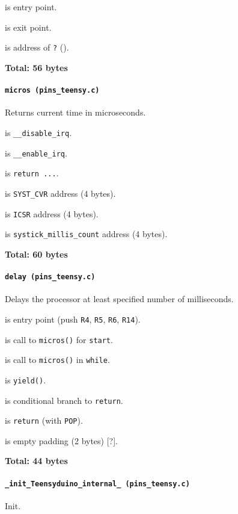  is entry point.

 is exit point.

 is address of \texttt{?} ().

\textbf{Total: 56 bytes}

\paragraph{\texttt{micros (pins\_teensy.c)}} Returns current time in
microseconds.

 is \texttt{\_\_disable\_irq}.

 is \texttt{\_\_enable\_irq}.

 is \texttt{return ...}.

\vspace{1em}

 is \texttt{SYST\_CVR} address (4 bytes).

 is \texttt{ICSR} address (4 bytes).

 is \texttt{systick\_millis\_count} address (4 bytes).

\textbf{Total: 60 bytes}

\paragraph{\texttt{delay (pins\_teensy.c)}} Delays the processor at least
specified number of milliseconds.

 is entry point (push \texttt{R4}, \texttt{R5},
\texttt{R6}, \texttt{R14}).

 is call to \texttt{micros()} for \texttt{start}.

 is call to \texttt{micros()} in \texttt{while}.

 is \texttt{yield()}.

 is conditional branch to \texttt{return}.

 is \texttt{return} (with \texttt{POP}).

 is empty padding (2 bytes) [?].

\textbf{Total: 44 bytes}

\paragraph{\texttt{\_init\_Teensyduino\_internal\_ (pins\_teensy.c)}}
Init.

